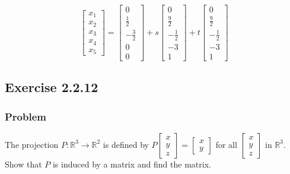 \documentclass[12pt]{article}
\begin{document}
\begin{equation*}
  \begin{bmatrix}
    x_1\\ 
    x_2\\ 
    x_3\\ 
    x_4\\ 
    x_5 
  \end{bmatrix} =
  \begin{bmatrix}
    0\\ 
    \frac{1}{2}\\ 
    -\frac{3}{2}\\ 
    0\\ 
    0 
  \end{bmatrix}
  + s 
  \begin{bmatrix}
    0\\ 
    \frac{9}{2}\\ 
    -\frac{1}{2}\\ 
    -3\\ 
    1 
  \end{bmatrix}
  + t 
  \begin{bmatrix}
    0\\ 
    \frac{9}{2}\\ 
    -\frac{1}{2}\\ 
    -3\\ 
    1 
  \end{bmatrix}
\end{equation*}
\vspace{2in}
\subsection*{Exercise 2.2.12}
\vspace{0.25in}
\subsubsection*{Problem}
The projection $P : \mathbb{R}^3 \rightarrow \mathbb{R}^2$ is defined by $P\begin{bmatrix}
  x\\ 
  y\\ 
  z 
\end{bmatrix} 
= 
\begin{bmatrix}
  x\\ 
  y 
\end{bmatrix}
$ 
for all
$\begin{bmatrix}
  x\\ 
  y\\ 
  z 
\end{bmatrix}
$ 
in $\mathbb{R}^3$. Show that $P$ is induced by a matrix and find the matrix. 
\vspace{0.25in}
\end{document}
